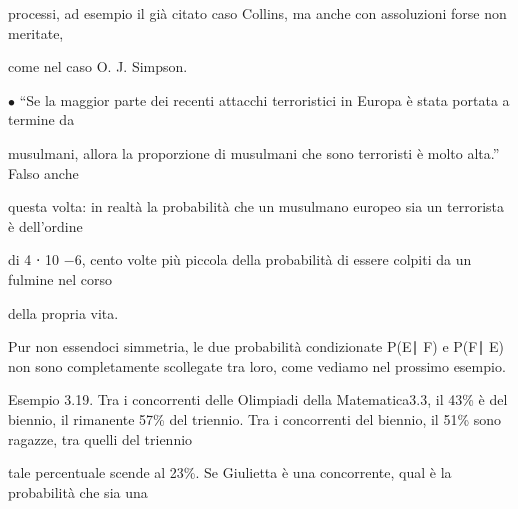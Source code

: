 \documentclass[a4paper,portrait,12pt]{article}
\begin{document}
\begin{flushleft}
processi, ad esempio il gi\`{a} citato caso Collins, ma anche con assoluzioni forse non meritate,
\end{flushleft}


\begin{flushleft}
come nel caso O. J. Simpson.
\end{flushleft}


\begin{flushleft}
$\bullet$ {``}Se la maggior parte dei recenti attacchi terroristici in Europa \`{e} stata portata a termine da
\end{flushleft}


\begin{flushleft}
musulmani, allora la proporzione di musulmani che sono terroristi \`{e} molto alta.'' Falso anche
\end{flushleft}


\begin{flushleft}
questa volta: in realt\`{a} la probabilit\`{a} che un musulmano europeo sia un terrorista \`{e} dell'ordine
\end{flushleft}


\begin{flushleft}
di 4 ⋅ 10 $-$6, cento volte più piccola della probabilit\`{a} di essere colpiti da un fulmine nel corso
\end{flushleft}


\begin{flushleft}
della propria vita.
\end{flushleft}


\begin{flushleft}
Pur non essendoci simmetria, le due probabilit\`{a} condizionate P(E∣ F) e P(F∣ E) non sono completamente scollegate tra loro, come vediamo nel prossimo esempio.
\end{flushleft}


\begin{flushleft}
Esempio 3.19. Tra i concorrenti delle Olimpiadi della Matematica3.3, il 43\% \`{e} del biennio, il rimanente 57\% del triennio. Tra i concorrenti del biennio, il 51\% sono ragazze, tra quelli del triennio
\end{flushleft}


\begin{flushleft}
tale percentuale scende al 23\%. Se Giulietta \`{e} una concorrente, qual \`{e} la probabilit\`{a} che sia una
\end{flushleft}
\end{document}
